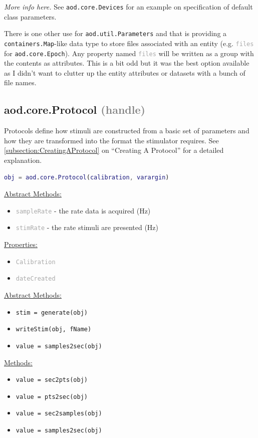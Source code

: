 \documentclass[10pt]{exam}
\newcommand\myurl[1]{\textcolor{blue}{\underline{#1}}}
\newcommand\myparent[1]{\textcolor{gray}{(#1)}}
\newcommand\aodclass[1]{\textcolor{codeblue}{\texttt{#1}}}
\newcommand\aodprop[1]{\textcolor{darkgray}{\texttt{#1}}}
\newcommand\aodfcn[1]{\textcolor{darkteal}{\texttt{#1}}}
\newcommand\docheader[1]{\vspace{0.6ex}\noindent\underline{#1}\vspace{0.15ex}}
\begin{document}
		\textit{More info here.} See \aodclass{aod.core.Devices} for an example on specification of default class parameters.
		
		There is one other use for \aodclass{aod.util.Parameters} and that is providing a \aodclass{containers.Map}-like data type to store files associated with an entity (e.g. \aodprop{files} for \aodclass{aod.core.Epoch}). Any property named \aodprop{files} will be written as a group with the contents as attributes. This is a bit odd but it was the best option available as I didn't want to clutter up the entity attributes or datasets with a bunch of file names.

	\subsection{aod.core.Protocol \myparent{handle}}
		\label{subsection:ProtocolDoc}
		\noindent Protocols define how stimuli are constructed from a basic set of parameters and how they are transformed into the format the stimulator requires. See \myurl{\ref{subsection:CreatingAProtocol}} on ``Creating A Protocol'' for a detailed explanation. 
		\begin{lstlisting}[language=matlab]
obj = aod.core.Protocol(calibration, varargin)
		\end{lstlisting}
	
		\docheader{Abstract Methods:}
		\begin{itemize}
			\item \aodprop{sampleRate} - the rate data is acquired (Hz)
			\item \aodprop{stimRate} - the rate stimuli are presented (Hz)
		\end{itemize}
		\docheader{Properties:}
		\begin{itemize}
			\item \aodprop{Calibration}
			\item \aodprop{dateCreated}
		\end{itemize}
		\docheader{Abstract Methods:}
		\begin{itemize}
			\item \aodfcn{stim = generate(obj)}
			\item \aodfcn{writeStim(obj, fName)}
			\item \aodfcn{value = samples2sec(obj)}
		\end{itemize}
		\docheader{Methods:}
		\begin{itemize}
			\item \aodfcn{value = sec2pts(obj)}
			\item \aodfcn{value = pts2sec(obj)}
			\item \aodfcn{value = sec2samples(obj)}
			\item \aodfcn{value = samples2sec(obj)}
		\end{itemize}
		
\end{document}
